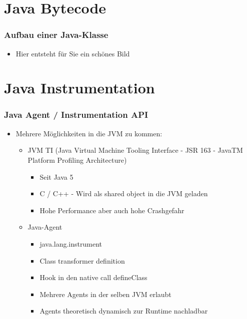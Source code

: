 \documentclass{beamer}
\begin{document}
\section{Java Bytecode}
	\begin{frame}
		\frametitle{Aufbau einer Java-Klasse}
		\begin{itemize}
			\item{Hier entsteht für Sie ein schönes Bild}
		\end{itemize}
	\end{frame}

\section{Java Instrumentation}
	\begin{frame}
		\frametitle{Java Agent / Instrumentation API}	
		\begin{itemize}
			\item{Mehrere Möglichkeiten in die JVM zu kommen:}
			\begin{itemize}
				\item{JVM TI (Java Virtual Machine Tooling Interface - JSR 163 - JavaTM Platform Profiling Architecture)}
				\begin{itemize}
					\item{Seit Java 5}
					\item{C / C++ - Wird als shared object in die JVM geladen}
					\item{Hohe Performance aber auch hohe Crashgefahr}
				\end{itemize}

				\item{Java-Agent}

				\begin{itemize}
					\item{java.lang.instrument}
					\item{Class transformer definition}
					\item{Hook in den native call defineClass}
					\item{Mehrere Agents in der selben JVM erlaubt}
					\item{Agents theoretisch dynamisch zur Runtime nachladbar}
				\end{itemize}
			\end{itemize}
		\end{itemize}
	\end{frame}
\end{document}
